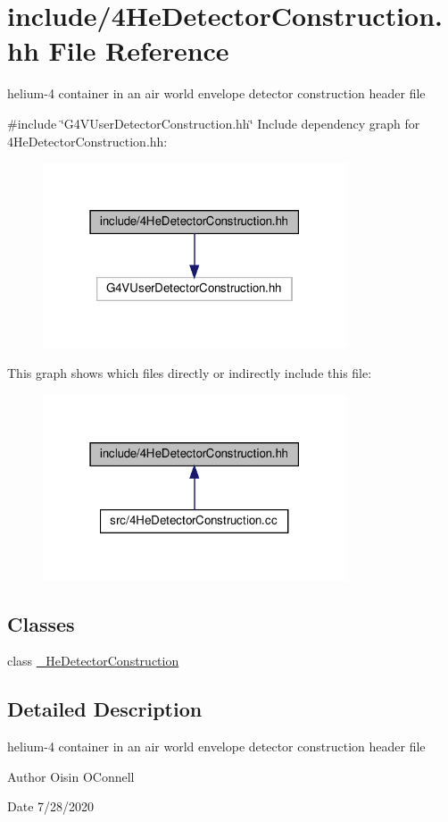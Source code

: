 \hypertarget{4HeDetectorConstruction_8hh}{}\section{include/4\+He\+Detector\+Construction.hh File Reference}
\label{4HeDetectorConstruction_8hh}


helium-\/4 container in an air world envelope detector construction header file  


{\ttfamily \#include \char`\"{}G4\+V\+User\+Detector\+Construction.\+hh\char`\"{}}\newline
Include dependency graph for 4\+He\+Detector\+Construction.hh\+:
\nopagebreak
\begin{figure}[H]
\begin{center}
\leavevmode
\includegraphics[width=255pt]{4HeDetectorConstruction_8hh__incl}
\end{center}
\end{figure}
This graph shows which files directly or indirectly include this file\+:
\nopagebreak
\begin{figure}[H]
\begin{center}
\leavevmode
\includegraphics[width=255pt]{4HeDetectorConstruction_8hh__dep__incl}
\end{center}
\end{figure}
\subsection*{Classes}
\begin{DoxyCompactItemize}
\item 
class \hyperlink{class__4HeDetectorConstruction}{\+\_\+He\+Detector\+Construction}
\end{DoxyCompactItemize}


\subsection{Detailed Description}
helium-\/4 container in an air world envelope detector construction header file 

\begin{DoxyAuthor}{Author}
Oisin O\textquotesingle{}Connell 
\end{DoxyAuthor}
\begin{DoxyDate}{Date}
7/28/2020 
\end{DoxyDate}
